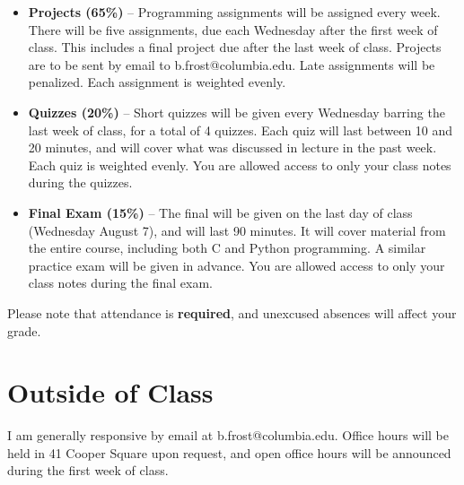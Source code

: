 \documentclass{article}
\begin{document}
\begin{itemize}

	\item \textbf{Projects (65\%)} -- Programming assignments will be assigned every week. There will be five assignments, due each Wednesday after the first week of class. This includes a final project due after the last week of class. Projects are to be sent by email to b.frost@columbia.edu. Late assignments will be penalized. Each assignment is weighted evenly.
	\item \textbf{Quizzes (20\%)} -- Short quizzes will be given every Wednesday barring the last week of class, for a total of 4 quizzes. Each quiz will last between 10 and 20 minutes, and will cover what was discussed in lecture in the past week. Each quiz is weighted evenly. You are allowed access to only your class notes during the quizzes.
	\item \textbf{Final Exam (15\%)} -- The final will be given on the last day of class (Wednesday August 7), and will last 90 minutes. It will cover material from the entire course, including both C and Python programming. A similar practice exam will be given in advance. You are allowed access to only your class notes during the final exam.

\end{itemize}

Please note that attendance is \textbf{required}, and unexcused absences will affect your grade.

\section*{Outside of Class}

I am generally responsive by email at b.frost@columbia.edu. Office hours will be held in 41 Cooper Square upon request, and open office hours will be announced during the first week of class.
\end{document}
